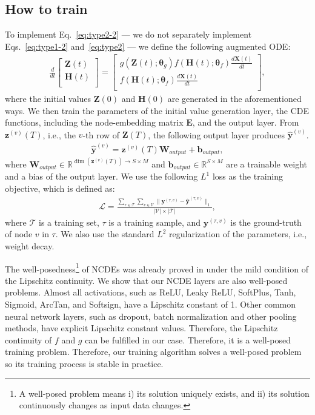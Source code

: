 \documentclass[letterpaper]{article} \usepackage{aaai22}  \usepackage{times}  \usepackage{helvet}  \usepackage{courier}  \usepackage[hyphens]{url}  \usepackage{graphicx} \urlstyle{rm} \def\UrlFont{\rm}  \usepackage{natbib}  \usepackage{caption} \DeclareCaptionStyle{ruled}{labelfont=normalfont,labelsep=colon,strut=off} \frenchspacing  \setlength{\pdfpagewidth}{8.5in}  \setlength{\pdfpageheight}{11in}  \usepackage{stfloats}
\begin{document}
\subsection{How to train}
To implement Eq.~\eqref{eq:type2-2} --- we do not separately implement Eqs.~\eqref{eq:type1-2} and~\eqref{eq:type2} --- we define the following augmented ODE:
\begin{align}
\frac{d}{dt}{\begin{bmatrix}
  \bm{Z}(t) \\
  \bm{H}(t) \\
  \end{bmatrix}\!} = {\begin{bmatrix}
  g(\bm{Z}(t);\bm{\theta}_g)f(\bm{H}(t);\bm{\theta}_f) \frac{d\bm{X}(t)}{dt} \\
  f(\bm{H}(t);\bm{\theta}_f) \frac{d\bm{X}(t)}{dt}\\
  \end{bmatrix}\!},
\end{align}where the initial values $\bm{Z}(0)$ and $\bm{H}(0)$ are generated in the aforementioned ways. We then train the parameters of the initial value generation layer, the CDE functions, including the node-embedding matrix $\bm{E}$, and the output layer. From $\bm{z}^{(v)}(T)$, i.e., the $v$-th row of $\bm{Z}(T)$, the following output layer produces $\hat{\bm{y}}^{(v)}$.
\begin{align}
    \hat{\bm{y}}^{(v)} = \bm{z}^{(v)}(T)\bm{W}_{output} + \bm{b}_{output}, \label{eq:output}
\end{align}where $\bm{W}_{output} \in \mathbb{R}^{\dim(\bm{z}^{(v)}(T)) \rightarrow S \times M}$ and $\bm{b}_{output} \in \mathbb{R}^{S \times M}$ are a trainable weight and a bias of the output layer. We use the following $L^1$ loss as the training objective, which is defined as:
\begin{align}
\mathcal{L} = \frac{\sum_{\tau \in \mathcal{T}}\sum_{v \in \mathcal{V}} \|\bm{y}^{(\tau,v)} - \hat{\bm{y}}^{(\tau,v)}\|_1}{|\mathcal{V}| \times |\mathcal{T}|}, \label{eq:loss}
\end{align}where $\mathcal{T}$ is a training set, $\tau$ is a training sample, and $\bm{y}^{(\tau,v)}$ is the ground-truth of node $v$ in $\tau$. We also use the standard $L^2$ regularization of the parameters, i.e., weight decay.

The well-posedness\footnote{A well-posed problem means i) its solution uniquely exists, and ii) its solution continuously changes as input data changes.} of NCDEs was already proved in \cite[Theorem 1.3]{lyons2007differential} under the mild condition of the Lipschitz continuity. We show that our NCDE layers are also well-posed problems. Almost all activations, such as ReLU, Leaky ReLU, SoftPlus, Tanh, Sigmoid, ArcTan, and Softsign, have a Lipschitz constant of 1. Other common neural network layers, such as dropout, batch normalization and other pooling methods, have explicit Lipschitz constant values. Therefore, the Lipschitz continuity of $f$ and $g$ can be fulfilled in our case. Therefore, it is a well-posed training problem. Therefore, our training algorithm solves a well-posed problem so its training process is stable in practice.
\end{document}
